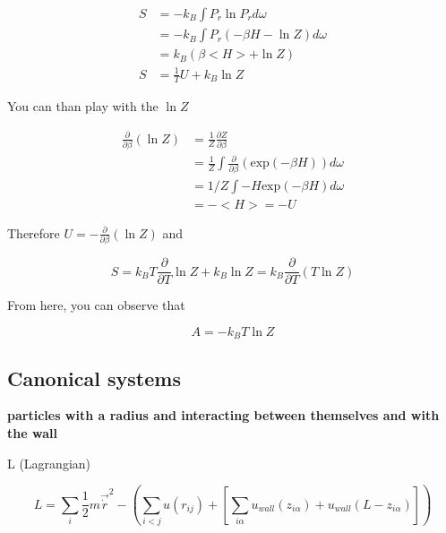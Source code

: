 	\begin{align*}
		S &= - k_B \int{P_r \ln{P_r} d\omega} \\
		&= - k_B \int{P_r (-\beta H - \ln{Z}) d\omega} \\
		&= k_B (\beta <H> + \ln{Z}) \\
		S &= \frac{1}{T} U + k_B \ln{Z}
	\end{align*}

	You can than play with the $\ln Z$ 

	\begin{align*}
		\frac{\partial}{\partial \beta} (\ln Z) &= \frac{1}{Z} 
		\frac{\partial Z}{\partial \beta} \\ 
		&= \frac{1}{Z} 
		\int{\frac{\partial}{\partial \beta} (\text{exp}(-\beta H)) d\omega} \\
		&= 1/Z \int{-H \text{exp}(-\beta H) d\omega} \\
		&= - <H> = -U
	\end{align*}

	Therefore $U = - \frac{\partial}{\partial \beta}(\ln{Z})$ and 

	$$
	S = k_B T \frac{\partial}{\partial T}\ln{Z} + k_B \ln{Z} = k_B \frac{\partial}{\partial T}(T \ln{Z})
	$$

	From here, you can observe that

	$$
	A =  - k_B T \ln{Z}
	$$


\subsection{Canonical systems}

\textbf{particles with a radius and interacting between themselves and with the wall}

L (Lagrangian)

$$
L = \sum_i{\frac{1}{2} m \vec{\dot{r}}}^2 - \left(\sum_{i<j}{u(r_{ij})} + \left[\sum_{i\alpha}{u_{wall}(z_{i\alpha}) + u_{wall}(L - z_{i\alpha})}\right]\right)
$$